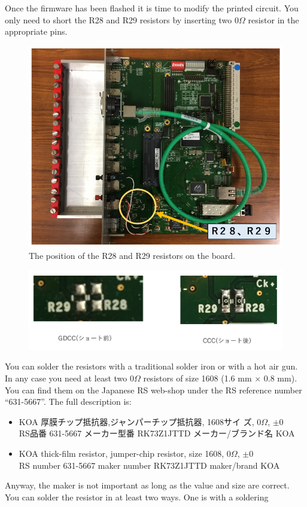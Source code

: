 Once the firmware has been flashed it is time to modify the printed circuit. You
only need to short the R28 and R29 resistors by inserting two $0\Omega$ resistor
in the appropriate pins.
\begin{figure}[H]
  \centering \includegraphics[width=0.5\linewidth,frame]{GDCC-CCC1}
  \caption{The position of the R28 and R29 resistors on the board.}
\end{figure}
\begin{figure}[H]
  \centering \includegraphics[width=0.8\linewidth]{GDCC-CCC2}
\end{figure}
You can solder the resistors with a traditional solder iron or with a hot air
gun. In any case you need at least two $0\Omega$ resistors of size 1608 (1.6 mm
× 0.8 mm). You can find them on the Japanese RS web-shop under the RS reference
number ``631-5667''. The full description is:
\begin{itemize}
\item \begin{CJK}{UTF8}{min}KOA 厚膜チップ抵抗器,ジャンパーチップ抵抗器, 1608サイ
    ズ, $0\Omega$, $\pm
    0$ \\
    RS品番 631-5667 メーカー型番 RK73Z1JTTD メーカー/ブランド名 KOA\end{CJK}
\item KOA thick-film resistor, jumper-chip resistor, size 1608, $0\Omega$, $\pm
  0$ \\
  RS number 631-5667 maker number RK73Z1JTTD maker/brand KOA
\end{itemize}
Anyway, the maker is not important as long as the value and size are correct.
You can solder the resistor in at least two ways. One is with a soldering
